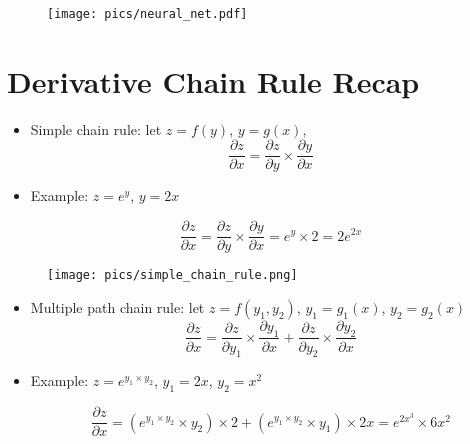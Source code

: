 \begin{figure}[htb]
	\centering
	 \texttt{[image: pics/neural\_net.pdf]}
\end{figure}


\section{Derivative Chain Rule Recap}

\begin{itemize}
\item Simple chain rule: let $z = f(y)$, $y = g(x)$, 
\begin{displaymath}
\frac{\partial z}{\partial x} = \frac{\partial z}{\partial y} \times \frac{\partial y}{\partial x}
\end{displaymath}

\item  Example: $z= e^{y}$, $y = 2x$ 

\begin{displaymath}
\frac{\partial z}{\partial x} = \frac{\partial z}{\partial y} \times \frac{\partial y}{\partial x} = e^{y} \times 2 = 2 e^{2x}
\end{displaymath}


\end{itemize}


\begin{figure}[htb]
	\centering
	 \texttt{[image: pics/simple\_chain\_rule.png]}
\end{figure}


\begin{itemize}
\item Multiple path chain rule: let $z = f(y_1,y_2)$, $y_1 = g_1(x)$, $y_2 =g_2(x)$ 
\begin{displaymath}
\frac{\partial z}{\partial x} = \frac{\partial z}{\partial y_1} \times \frac{\partial y_1}{\partial x} + \frac{\partial z}{\partial y_2} \times \frac{\partial y_2}{\partial x}
\end{displaymath}

\item  Example: $z= e^{y_1 \times y_2}$, $y_1 = 2x$, $y_2 = x^2$ 

\begin{displaymath}
\frac{\partial z}{\partial x} = (e^{y_1 \times y_2}\times y_2) \times 2 + (e^{y_1 \times y_2}\times y_1) \times 2x = e^{2x^3} \times 6x^2
\end{displaymath}


\end{itemize}


